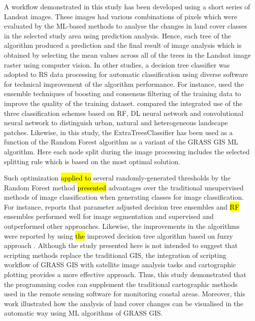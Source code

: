 \documentclass[coasts,article,submit,pdftex,moreauthors]{Definitions/mdpi}
\begin{document}
A workflow demonstrated in this study has been developed using a short series of Landsat images. These images had various combinations of pixels which were evaluated by the ML-based methods to analyse the changes in land cover classes in the selected study area using prediction analysis. Hence, each tree of the algorithm produced a prediction and the final result of image analysis which is obtained by selecting the mean values across all of the trees in the Landsat image raster using computer vision. In other studies, a decision tree classifier was adopted to RS data processing for automatic classification using diverse software for technical improvement of the algorithm performance. For instance, \cite{BROWNDECOLSTOUN2003316} used the ensemble techniques of boosting and consensus filtering of the training data to improve the quality of the training dataset. \cite{VAIDYA2024101770} compared the integrated use of the three classification schemes based on RF, DL neural network and convolutional neural network to distinguish urban, natural and heterogeneous landscape patches. Likewise, in this study, the ExtraTreesClassifier has been used as a function of the Random Forest algorithm as a variant of the GRASS GIS ML algorithm. Here each node split during the image processing includes the selected splitting rule which is based on the most optimal solution. 

Such optimization \hl{applied to} several randomly-generated thresholds by the Random Forest method \hl{presented} advantages over the traditional unsupervised methods of image classification when generating classes for image classification. For instance, \cite{PASQUARELLA2023103561} reports that parameter adjusted decision tree ensembles and \hl{RF} ensembles performed well for image segmentation and supervised and outperformed other approaches. Likewise, the improvements in the algorithms were reported by using \hl{the }improved decision tree algorithm based on\hl{ }fuzzy approach \cite{ALOBEIDAT20151192}. Although the study presented here is not intended to suggest that scripting methods replace the traditional GIS, the integration of scripting workflow of GRASS GIS with satellite image analysis tasks and cartographic plotting provides a more effective approach. Thus, this study demonstrated that the programming codes can supplement the traditional cartographic methods used in the remote sensing software for monitoring coastal areas. Moreover, this work illustrated how the analysis of land cover changes can be visualised in the automatic way using ML algorithms of GRASS GIS. 
\end{document}
